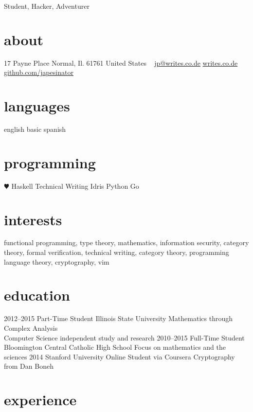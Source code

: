 \documentclass[]{friggeri-cv}
\begin{document}
       {Student, Hacker, Adventurer}


\begin{aside}
  \section{about}
    17 Payne Place
    Normal, Il. 61761
    United States
    ~
    \href{mailto:jp@writes.co.de}{jp@writes.co.de}
    \href{http://writes.co.de}{writes.co.de}
    \href{http://github.com/japesinator}{github.com/japesinator}
  \section{languages}
    english
    basic spanish
  \section{programming}
    {\color{red} $\varheartsuit$} Haskell
    Technical Writing
    Idris
    Python
    Go
\end{aside}

\section{interests}

functional programming, type theory, mathematics, information security,
category theory, formal verification, technical writing, category theory,
programming language theory, cryptography, vim

\section{education}

\begin{entrylist}
  \entry
    {2012–2015}
    {Part-Time Student}
    {Illinois State University}
    {Mathematics through Complex Analysis\\
    Computer Science independent study and research}
  \entry
    {2010–2015}
    {Full-Time Student}
    {Bloomington Central Catholic High School}
    {Focus on mathematics and the sciences}
  \entry
    {2014}
    {Stanford University}
    {Online Student via Coursera}
    {Cryptography from Dan Boneh}
\end{entrylist}

\section{experience}
\end{document}
